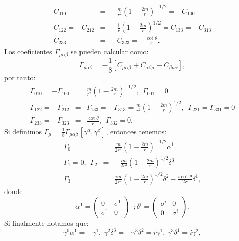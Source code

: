 \begin{eqnarray}
\nonumber C_{010}&=&-\frac{m}{r^{2}}\left(1-\frac{2m}{r}\right)^{-1/2}=-C_{100}\\
\nonumber C_{122}=-C_{212}&=&-\frac{1}{r}\left(1-\frac{2m}{r}\right)^{1/2}=C_{133}=-C_{313}\\
C_{233}&=&-C_{323}=-\frac{\cot\theta}{r} .
\end{eqnarray}
Los coeficientes $\Gamma_{\mu\alpha\beta}$ se pueden calcular como:
\begin{equation}
\Gamma_{\mu\alpha\beta}=-\frac{1}{8}[C_{\mu\alpha\beta}+C_{\alpha\beta\mu}-C_{\beta\mu\alpha}]	,
\end{equation}
por tanto:
\begin{eqnarray}
\nonumber \Gamma_{010}=-\Gamma_{100}&=&\frac{m}{r^{2}}\left(1-\frac{2m}{r}\right)^{-1/2},\ \ \Gamma_{001}=0\\
\nonumber \Gamma_{122}=-\Gamma_{212}&=&\Gamma_{133}=-\Gamma_{313}=\frac{m}{r^{2}}\left(1-\frac{2m}{r}\right)^{1/2},\ \ \Gamma_{221}=\Gamma_{331}=0\\
\Gamma_{233}=-\Gamma_{323}&=&\frac{\cot\theta}{r},\ \ \Gamma_{332}=0 .
\end{eqnarray}
Si definimos $\Gamma_{\mu}=\frac{1}{8}\Gamma_{\mu\alpha\beta}[\gamma^\alpha,\gamma^\beta]$, entonces tenemos:
\begin{eqnarray}
\nonumber \Gamma_{0}&=&\frac{m}{2r^{2}}\left(1-\frac{2m}{r}\right)^{-1/2}\alpha^{1}\\
\nonumber \Gamma_{1}=0,\ \ \Gamma_{2}&=&-\frac{im}{2r^{2}}\left(1-\frac{2m}{r}\right)^{1/2}\delta^{3}\\
\Gamma_{3}&=&\frac{im}{2r^{2}}\left(1-\frac{2m}{r}\right)^{1/2}\delta^{2}-\frac{i\cot\theta}{2r}\delta^{1},
\end{eqnarray}
donde  
\begin{equation}
\alpha^{1}=\left(\begin{array}{cc}
0 & \sigma^{1}\\
\sigma^{1} & 0
\end{array}\right)\ \ ;\delta^{i}=\left(\begin{array}{cc}
\sigma^{i} & 0\\
0 & \sigma^{i}
\end{array}\right) .
\end{equation}
Si finalmente notamos que:
\begin{equation}
\gamma^{0}\alpha^{1}=-\gamma^{1},\ \gamma^{2}\delta^{3}=-\gamma^{3}\delta^{2}=i\gamma^{1},\ \gamma^{3}\delta^{1}=i\gamma^{2} ,
\end{equation}	
